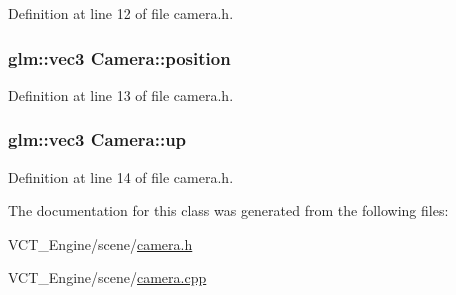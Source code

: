 Definition at line 12 of file camera.\+h.

\hypertarget{class_camera_a04b5db2c530d8630660e8cfb93a4b3b5}{}
\subsubsection[{position}]{\setlength{\rightskip}{0pt plus 5cm}glm\+::vec3 Camera\+::position}\label{class_camera_a04b5db2c530d8630660e8cfb93a4b3b5}


Definition at line 13 of file camera.\+h.

\hypertarget{class_camera_a3fe5f351380fb118ffc600591769f049}{}
\subsubsection[{up}]{\setlength{\rightskip}{0pt plus 5cm}glm\+::vec3 Camera\+::up}\label{class_camera_a3fe5f351380fb118ffc600591769f049}


Definition at line 14 of file camera.\+h.



The documentation for this class was generated from the following files\+:\begin{DoxyCompactItemize}
\item 
V\+C\+T\+\_\+\+Engine/scene/\hyperlink{camera_8h}{camera.\+h}\item 
V\+C\+T\+\_\+\+Engine/scene/\hyperlink{camera_8cpp}{camera.\+cpp}\end{DoxyCompactItemize}

